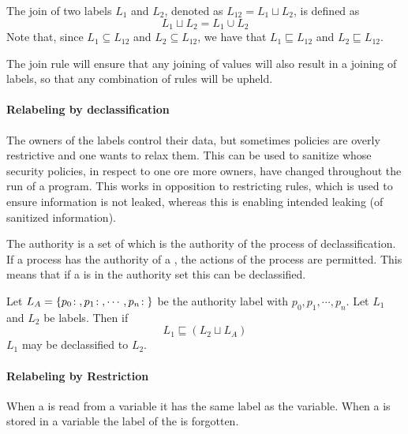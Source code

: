 \begin{definition}
  The join of two labels $L_1$ and $L_2$, denoted as $L_{12} = L_1 \sqcup L_2$, is defined as
  $$L_1 \sqcup L_2 = L_1 \cup L_2$$
  Note that, since $L_1 \subseteq L_{12}$ and $L_2 \subseteq L_{12}$, we have that $L_1 \sqsubseteq L_{12}$ and $L_2 \sqsubseteq L_{12}$.
\end{definition}

The join rule will ensure that any joining of values will also result in a joining of labels, so that any combination of rules will be upheld.

\paragraph{Relabeling by declassification}
The owners of the labels control their data, but sometimes policies are overly restrictive and one wants to relax them.
This can be used to sanitize \xvalues{} whose security policies, in respect to one ore more owners, have changed throughout the run of a program.
This works in opposition to restricting rules, which is used to ensure information is not leaked, whereas this is enabling intended leaking (of sanitized information).

The authority is a set of \principals{} which is the authority of the process of declassification.
If a process has the authority of a \principal{}, the actions of the process are permitted.
This means that if a \principal{} is in the authority set this can be declassified.

\begin{definition}
  Let $L_A = \{p_0\!:\;, p_1\!:\;, \cdots, p_n\!:\;\}$ be the authority label with \principals{} $p_0, p_1, \cdots, p_n$.
  Let $L_1$ and $L_2$ be labels.
  Then if $$L_1 \sqsubseteq (L_2 \sqcup L_A)$$
  $L_1$ may be declassified to $L_2$.
\end{definition}

\paragraph{Relabeling by Restriction}
When a \xvalue{} is read from a variable it has the same label as the variable.
When a \xvalue{} is stored in a variable the label of the \xvalue{} is forgotten.


